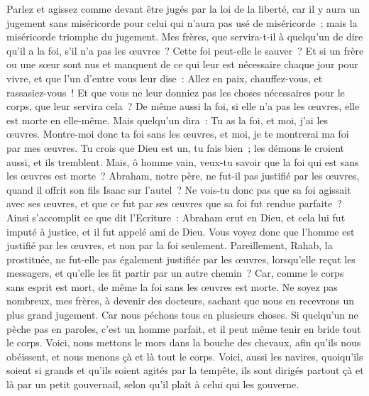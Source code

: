 \begin{multicols}{2}
Parlez et agissez comme devant être jugés par la loi de la liberté,
car il y aura un jugement sans miséricorde pour celui qui n'aura pas usé de miséricorde~; mais la miséricorde triomphe du jugement.
Mes frères, que servira-t-il à quelqu'un de dire qu'il a la foi, s'il n'a pas les œuvres~? Cette foi peut-elle le sauver~?
Et si un frère ou une sœur sont nus et manquent de ce qui leur est nécessaire chaque jour pour vivre,
et que l'un d'entre vous leur dise~: Allez en paix, chauffez-vous, et rassasiez-vous~! Et que vous ne leur donniez pas les choses nécessaires pour le corps, que leur servira cela~?
De même aussi la foi, si elle n'a pas les œuvres, elle est morte en elle-même.
Mais quelqu'un dira~: Tu as la foi, et moi, j'ai les œuvres. Montre-moi donc ta foi sans les œuvres, et moi, je te montrerai ma foi par mes œuvres.
Tu crois que Dieu est un, tu fais bien~; les démons le croient aussi, et ils tremblent.
Mais, ô homme vain, veux-tu savoir que la foi qui est sans les œuvres est morte~?
Abraham, notre père, ne fut-il pas justifié par les œuvres, quand il offrit son fils Isaac sur l'autel~?
Ne vois-tu donc pas que sa foi agissait avec ses œuvres, et que ce fut par ses œuvres que sa foi fut rendue parfaite~?
Ainsi s'accomplit ce que dit l'Ecriture~: Abraham crut en Dieu, et cela lui fut imputé à justice, et il fut appelé ami de Dieu.
Vous voyez donc que l'homme est justifié par les œuvres, et non par la foi seulement.
Pareillement, Rahab, la prostituée, ne fut-elle pas également justifiée par les œuvres, lorsqu'elle reçut les messagers, et qu'elle les fit partir par un autre chemin~?
Car, comme le corps sans esprit est mort, de même la foi sans les œuvres est morte.
\VerseOne{}Ne soyez pas nombreux, mes frères, à devenir des docteurs, sachant que nous en recevrons un plus grand jugement.
Car nous péchons tous en plusieurs choses. Si quelqu'un ne pèche pas en paroles, c'est un homme parfait, et il peut même tenir en bride tout le corps.
Voici, nous mettons le mors dans la bouche des chevaux, afin qu'ils nous obéissent, et nous menons çà et là tout le corps.
Voici, aussi les navires, quoiqu'ils soient si grands et qu'ils soient agités par la tempête, ils sont dirigés partout çà et là par un petit gouvernail, selon qu'il plaît à celui qui les gouverne.

\end{multicols}
